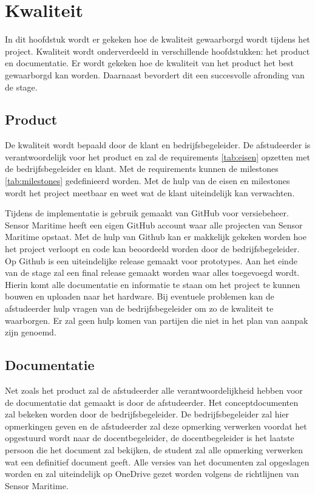 \newpage
\section{Kwaliteit}
In dit hoofdstuk wordt er gekeken hoe de kwaliteit gewaarborgd wordt tijdens het project. Kwaliteit wordt onderverdeeld in verschillende hoofdstukken: het product en documentatie. Er wordt gekeken hoe de kwaliteit van het product het best gewaarborgd kan worden. Daarnaast bevordert dit een succesvolle afronding van de stage.

\subsection{Product}
De kwaliteit wordt bepaald door de klant en bedrijfsbegeleider. De afstudeerder is verantwoordelijk voor het product en zal de requirements \ref{tab:eisen} opzetten met de bedrijfsbegeleider en klant. Met de requirements kunnen de milestones \ref{tab:milestones} gedefinieerd worden. Met de hulp van de eisen en milestones wordt het project meetbaar en weet wat de klant uiteindelijk kan verwachten. \newline

\noindent Tijdens de implementatie is gebruik gemaakt van GitHub voor versiebeheer. Sensor Maritime heeft een eigen GitHub account waar alle projecten van Sensor Maritime opstaat. Met de hulp van Github kan er makkelijk gekeken worden hoe het project verloopt en code kan beoordeeld worden door de bedrijfsbegeleider. Op Github is een uiteindelijke release gemaakt voor prototypes. Aan het einde van de stage zal een final release gemaakt worden waar alles toegevoegd wordt. Hierin komt alle documentatie en informatie te staan om het project te kunnen bouwen en uploaden naar het hardware. Bij eventuele problemen kan de afstudeerder hulp vragen van de bedrijfsbegeleider om zo de kwaliteit te waarborgen. Er zal geen hulp komen van partijen die niet in het plan van aanpak zijn genoemd.

\subsection{Documentatie}
Net zoals het product zal de afstudeerder alle verantwoordelijkheid hebben voor de documentatie dat gemaakt is door de afstudeerder. Het conceptdocumenten zal bekeken worden door de bedrijfsbegeleider. De bedrijfsbegeleider zal hier opmerkingen geven en de afstudeerder zal deze opmerking verwerken voordat het opgestuurd wordt naar de docentbegeleider, de docentbegeleider is het laatste persoon die het document zal bekijken, de student zal alle opmerking verwerken wat een definitief document geeft. Alle versies van het documenten zal opgeslagen worden en zal uiteindelijk op OneDrive gezet worden volgens de richtlijnen van Sensor Maritime.
